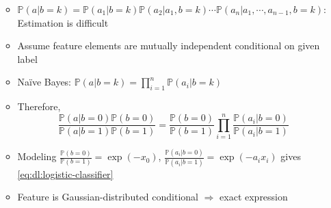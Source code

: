 \begin{itemize}
\begin{itemize}
\begin{equation}
        \end{equation}
        \item $\mathbb{P}(a|b=k)=\mathbb{P}(a_1|b=k)\mathbb{P}(a_2|a_1,b=k)\cdots\mathbb{P}(a_n|a_1,\cdots,a_{n-1},b=k)$: Estimation is difficult
        \item Assume feature elements are mutually independent conditional on given label
        \item Na\"ive Bayes: $\mathbb{P}(a|b=k)=\prod_{i=1}^{n}\mathbb{P}(a_i|b=k)$
        \item Therefore,
        \begin{equation}
            \frac{\mathbb{P}(a|b=0)\mathbb{P}(b=0)}{\mathbb{P}(a|b=1)\mathbb{P}(b=1)}=\frac{\mathbb{P}(b=0)}{\mathbb{P}(b=1)}\prod_{i=1}^n\frac{\mathbb{P}(a_i|b=0)}{\mathbb{P}(a_i|b=1)}
        \end{equation}
        \item Modeling $\frac{\mathbb{P}(b=0)}{\mathbb{P}(b=1)}=\exp(-x_0)$, $\frac{\mathbb{P}(a_i|b=0)}{\mathbb{P}(a_i|b=1)}=\exp(-a_ix_i)$ gives \ref{eq:dl:logistic-classifier}
        \item Feature is Gaussian-distributed conditional $\Rightarrow$ exact expression
    \end{itemize}
\end{itemize}

